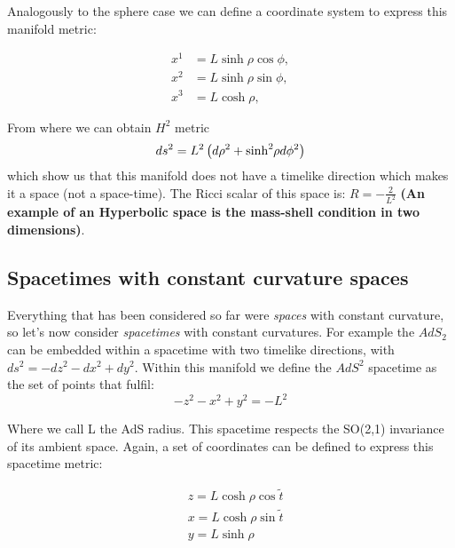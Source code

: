 \documentclass[12pt]{article}
\begin{document}
\vspace{0.5cm}

Analogously to the sphere case we can define a coordinate system to express this manifold metric:

\begin{equation}
\begin{aligned}
    x^1 &= L \sinh{ \rho } \cos{ \phi }, \\
    x^2 &= L \sinh{ \rho } \sin{ \phi }, \\
    x^3 &= L \cosh{ \rho },
\end{aligned}
\end{equation}

From where we can obtain \( H^2 \) metric
\begin{equation}
    ds^2 = L^2 \left( d\rho^2 + \sinh^2{ \hspace{-2pt}\rho } d\phi^2 \right)
\end{equation}
which show us that this manifold does not have a timelike direction which makes it a space (not a space-time). The Ricci scalar of this space is: \( R = - \frac{2}{L^2} \) \textbf{(An example of an Hyperbolic space is the mass-shell condition in two dimensions)}.

\subsection{Spacetimes with constant curvature spaces}

Everything that has been considered so far were \textit{spaces} with constant curvature, so let's now consider \textit{spacetimes} with constant curvatures. For example the \( AdS_2 \) can be embedded within a spacetime with two timelike directions, with \( ds^2 = -dz^2 - dx^2 + dy^2\). Within this manifold we define the \( AdS^2 \) spacetime as the set of points that fulfil:
\begin{equation}
    -z^2 - x^2 + y^2 = -L^2
\end{equation}

Where we call L the AdS radius. This spacetime respects the SO(2,1) invariance of its ambient space. Again, a set of coordinates can be defined to express this spacetime metric:

\begin{equation}
\begin{aligned}
    & z = L \cosh{ \rho } \cos{ \tilde{t} } \\
    & x = L \cosh{ \rho } \sin{ \tilde{t} } \\
    & y = L \sinh{ \rho }
\end{aligned}
\end{equation}
\end{document}
